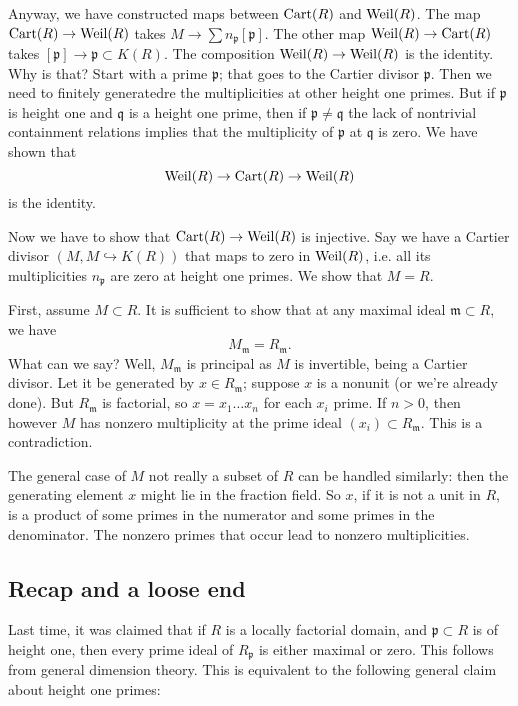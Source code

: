 Anyway, we have constructed maps between $\operatorname{Cart}(R) $ and $\operatorname{Weil}(R)$. The map
$\operatorname{Cart}(R) \to \operatorname{Weil}(R)$ takes $M \to \sum n_{\mathfrak{p}}[\mathfrak{p}]$. The
other map $\operatorname{Weil}(R) \to \operatorname{Cart}(R)$ takes $[\mathfrak{p}] \to \mathfrak{p}
\subset K(R)$. The composition $\operatorname{Weil}(R) \to \operatorname{Weil}(R)$ is the identity. Why is that? Start with a
prime $\mathfrak{p}$; that goes to the Cartier divisor $\mathfrak{p}$. Then we
need to finitely generatedre the multiplicities at other height one primes. But if
$\mathfrak{p}$ is height one and $\mathfrak{q}$ is a height one prime, then if
$\mathfrak{p} \neq \mathfrak{q}$ the lack of nontrivial containment relations
implies that the multiplicity of $\mathfrak{p}$ at $\mathfrak{q}$ is zero. We
have shown that
\[  \operatorname{Weil}(R) \to \operatorname{Cart}(R) \to \operatorname{Weil}(R)  \]
is the identity.

Now we have to show that $\operatorname{Cart}(R) \to \operatorname{Weil}(R)$ is injective. Say we have a
Cartier divisor $(M, M \hookrightarrow K(R))$ that maps to zero in $\operatorname{Weil}(R)$,
i.e. all its multiplicities
$n_{\mathfrak{p}}$ are zero at height one primes. 
We show that $M  = R$. 

First, assume $M \subset R$. 
It is sufficient to show that at any maximal ideal $\mathfrak{m} \subset R$, we
have
\[ M_{\mathfrak{m}} = R_{\mathfrak{m}}.  \]
What can we say? Well, $M_{\mathfrak{m}}$ is principal as $M$ is invertible,
being a Cartier divisor. Let it be generated by $x \in R_{\mathfrak{m}}$;
suppose $x$ is a nonunit (or we're already done). But
$R_{\mathfrak{m}}$ is factorial, so $x = x_1 \dots x_n$ for each $x_i $ prime.
If $n>0$, then however $M$ has nonzero multiplicity at the prime ideal  $(x_i) \subset
R_{\mathfrak{m}} $. This is a contradiction. 

The general case of $M$ not really a  subset of $R$ can be handled similarly:
then the generating element $x$ might lie in the fraction field. So $x$, if it
is not a unit in $R$, is a
product of some primes in the numerator and some primes in the denominator. 
The nonzero primes that occur lead to nonzero multiplicities. 

\subsection{Recap and a loose end}

Last time, it was claimed that if $R$ is a locally factorial domain, and
$\mathfrak{p} \subset R$ is of height one, then every prime ideal of
$R_{\mathfrak{p}}$ is either maximal or zero. This follows from general
dimension theory. This is equivalent to the following general claim about
height one primes:

